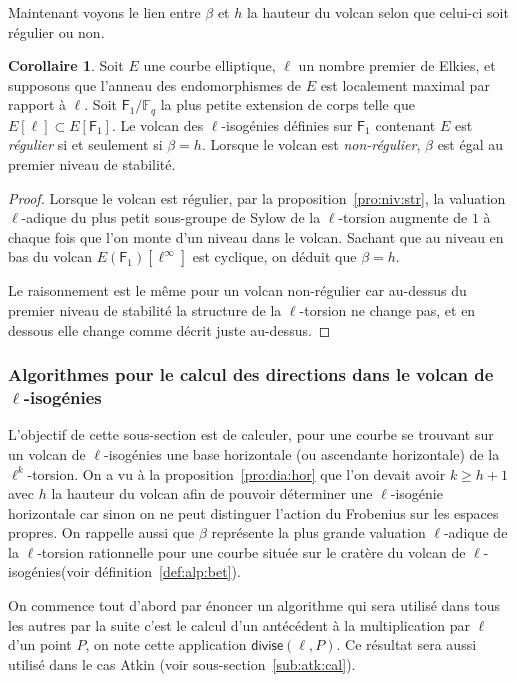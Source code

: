 \documentclass[10pt,a4paper]{book}
\theoremstyle{plain}
\theoremstyle{definition}
\theoremstyle{definition}
\theoremstyle{definition}
\newtheorem{cor}[thm]{Corollaire}
\theoremstyle{definition}
\theoremstyle{definition}
\theoremstyle{remark}
\theoremstyle{remark}
\theoremstyle{definition}
\begin{document}
Maintenant voyons le lien entre $\beta$ et $h$ la hauteur du volcan selon que
celui-ci soit régulier ou non.

\begin{cor}
\label{cor:elk:bet:reg}
Soit $E$ une courbe elliptique, $\ell$ un nombre premier de Elkies, et
supposons que l'anneau des endomorphismes de $E$ est localement
maximal par rapport à $\ell$. Soit $\mathsf{F}_1/\mathbb{F}_q$ la plus
petite extension de corps telle que $E[\ell] \subset E[\mathsf{F}_1]$.
Le volcan des $\ell$-isogénies définies sur $\mathsf{F}_1$ contenant
$E$ est \emph{régulier} si et seulement si $\beta=h$.  Lorsque le
volcan est \emph{non-régulier}, $\beta$ est égal au premier niveau de
stabilité.
\end{cor}

\begin{proof}
Lorsque le volcan est régulier, par la proposition~\ref{pro:niv:str}, la 
valuation $\ell$-adique du plus petit sous-groupe de Sylow  de la $\ell$-torsion
augmente de $1$ à chaque fois que l'on monte d'un niveau dans le volcan. Sachant
que au niveau en bas du volcan $E(\mathsf{F}_1)[\ell^{\infty}]$ est 
cyclique, on déduit que $\beta=h$.

Le raisonnement est le même pour un volcan non-régulier car au-dessus du 
premier niveau de stabilité la structure de la $\ell$-torsion ne change pas, et 
en dessous elle change comme décrit juste au-dessus.
\end{proof}

\subsubsection{Algorithmes pour le calcul des directions dans le volcan de $\ell$-isogénies}

L'objectif de cette sous-section est de calculer, pour une courbe se trouvant 
sur un volcan de $\ell$-isogénies une base horizontale (ou ascendante 
horizontale) de la $\ell^k$-torsion. On a vu à la proposition~\ref{pro:dia:hor}
que l'on devait avoir $k \geqslant h+1$ avec $h$ la hauteur du volcan afin de 
pouvoir déterminer une $\ell$-isogénie horizontale car sinon on ne peut 
distinguer l'action du Frobenius sur les espaces propres. On 
rappelle aussi que $\beta$ représente la plus grande valuation $\ell$-adique de
la $\ell$-torsion rationnelle pour une courbe située sur le cratère du volcan 
de $\ell$-isogénies(voir définition~\ref{def:alp:bet}).

On commence tout d'abord par énoncer un algorithme qui sera utilisé dans tous 
les autres par la suite c'est le calcul d'un antécédent à la 
multiplication par $\ell$ d'un point $P$, on note cette application 
$\mathsf{divise}(\ell,P)$. Ce résultat sera aussi utilisé dans le cas Atkin 
(voir sous-section~\ref{sub:atk:cal}).
\end{document}
